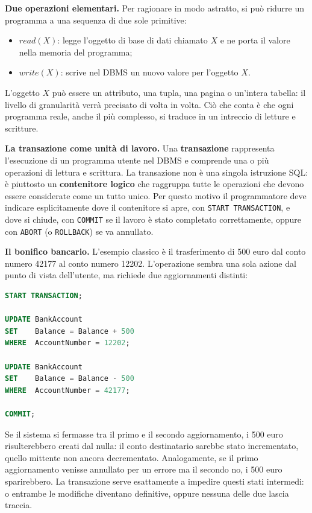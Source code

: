 \documentclass[12pt]{extarticle}
\begin{document}
\medskip
\noindent \textbf{Due operazioni elementari.} Per ragionare in modo astratto, si può ridurre un programma a una sequenza di due sole primitive:
\begin{itemize}
    \item $read(X)$: legge l'oggetto di base di dati chiamato $X$ e ne porta il valore nella memoria del programma;
    \item $write(X)$: scrive nel DBMS un nuovo valore per l'oggetto $X$.
\end{itemize}
L'oggetto $X$ può essere un attributo, una tupla, una pagina o un'intera tabella: il livello di granularità verrà precisato di volta in volta. Ciò che conta è che ogni programma reale, anche il più complesso, si traduce in un intreccio di letture e scritture.

\medskip
\noindent \textbf{La transazione come unità di lavoro.} Una \textbf{transazione} rappresenta l'esecuzione di un programma utente nel DBMS e comprende una o più operazioni di lettura e scrittura. La transazione non è una singola istruzione SQL: è piuttosto un \textbf{contenitore logico} che raggruppa tutte le operazioni che devono essere considerate come un tutto unico. Per questo motivo il programmatore deve indicare esplicitamente dove il contenitore si apre, con \texttt{START TRANSACTION}, e dove si chiude, con \texttt{COMMIT} se il lavoro è stato completato correttamente, oppure con \texttt{ABORT} (o \texttt{ROLLBACK}) se va annullato.

\medskip
\noindent \textbf{Il bonifico bancario.} L'esempio classico è il trasferimento di 500 euro dal conto numero 42177 al conto numero 12202. L'operazione sembra una sola azione dal punto di vista dell'utente, ma richiede due aggiornamenti distinti:

\begin{lstlisting}[language=SQL, caption={Il bonifico come transazione esplicita}]
START TRANSACTION;

UPDATE BankAccount
SET    Balance = Balance + 500
WHERE  AccountNumber = 12202;

UPDATE BankAccount
SET    Balance = Balance - 500
WHERE  AccountNumber = 42177;

COMMIT;
\end{lstlisting}

\noindent Se il sistema si fermasse tra il primo e il secondo aggiornamento, i 500 euro risulterebbero creati dal nulla: il conto destinatario sarebbe stato incrementato, quello mittente non ancora decrementato. Analogamente, se il primo aggiornamento venisse annullato per un errore ma il secondo no, i 500 euro sparirebbero. La transazione serve esattamente a impedire questi stati intermedi: o entrambe le modifiche diventano definitive, oppure nessuna delle due lascia traccia.
\end{document}
